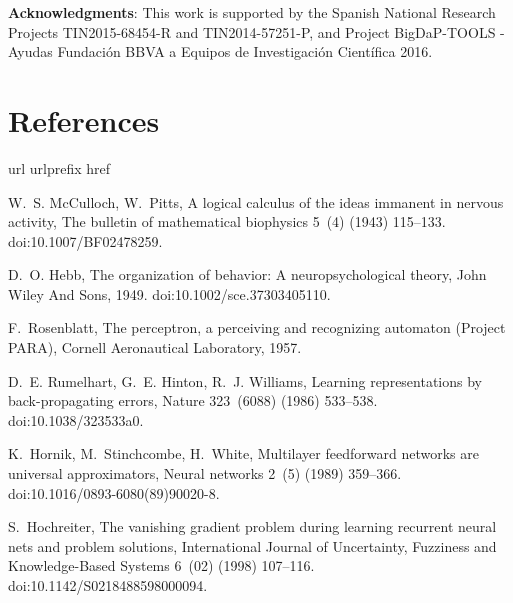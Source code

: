 \documentclass[preprint,5p,compress]{elsarticle}
\begin{document}
\textbf{Acknowledgments}:  This work is supported by the Spanish National Research Projects TIN2015-68454-R and  TIN2014-57251-P, and Project BigDaP-TOOLS - Ayudas Fundaci\'on BBVA a Equipos de Investigaci\'on Cient\'ifica 2016. 

\section*{References}



\begin{thebibliography}{100}
\expandafter\ifx\csname url\endcsname\relax
  \def\url#1{\texttt{#1}}\fi
\expandafter\ifx\csname urlprefix\endcsname\relax\def\urlprefix{URL }\fi
\expandafter\ifx\csname href\endcsname\relax
  \def\href#1#2{#2} \def\path#1{#1}\fi

W.~S. McCulloch, W.~Pitts, A logical calculus of the ideas immanent in nervous
  activity, The bulletin of mathematical biophysics 5~(4) (1943) 115--133.
\newblock \href {http://dx.doi.org/10.1007/BF02478259}
  {\path{doi:10.1007/BF02478259}}.

D.~O. Hebb, The organization of behavior: A neuropsychological theory, John
  Wiley And Sons, 1949.
\newblock \href {http://dx.doi.org/10.1002/sce.37303405110}
  {\path{doi:10.1002/sce.37303405110}}.

F.~Rosenblatt, The perceptron, a perceiving and recognizing automaton (Project
  {PARA}), Cornell Aeronautical Laboratory, 1957.

D.~E. Rumelhart, G.~E. Hinton, R.~J. Williams, Learning representations by
  back-propagating errors, Nature 323~(6088) (1986) 533--538.
\newblock \href {http://dx.doi.org/10.1038/323533a0}
  {\path{doi:10.1038/323533a0}}.

K.~Hornik, M.~Stinchcombe, H.~White, Multilayer feedforward networks are
  universal approximators, Neural networks 2~(5) (1989) 359--366.
\newblock \href {http://dx.doi.org/10.1016/0893-6080(89)90020-8}
  {\path{doi:10.1016/0893-6080(89)90020-8}}.

S.~Hochreiter, The vanishing gradient problem during learning recurrent neural
  nets and problem solutions, International Journal of Uncertainty, Fuzziness
  and Knowledge-Based Systems 6~(02) (1998) 107--116.
\newblock \href {http://dx.doi.org/10.1142/S0218488598000094}
  {\path{doi:10.1142/S0218488598000094}}.


\end{thebibliography}
\end{document}
